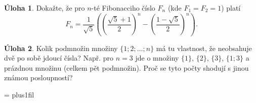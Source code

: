 \documentclass[10pt,a5paper]{extarticle}
\let\results\newpage
\let\endresults\relax
\theoremstyle{definition}
\newtheorem{uloha}{\atr Úloha}
\def\vysld{}
\let\printvysl\relax
\def\atr{}
\def\interest{\def\atr{\llap{$\star$ }\gdef\atr{}}}
\def\iinterest{\def\atr{\llap{$\star\star$ }\gdef\atr{}}}
\begin{document}
\interest
\begin{uloha}
Dokažte, že pro $n$-té Fibonacciho číslo $F_n$ (kde $F_1=F_2 = 1$) platí
\[ F_n = \frac{1}{\sqrt5}\left( \left( \frac{\sqrt5+1}{2} \right)^n - \left( \frac{1-\sqrt5}{2} \right)^n  \right). \]
\end{uloha}


\iinterest
\begin{uloha}
Kolik podmnožin množiny $\{1; 2; \dots; n\}$ má tu vlastnost, že neobsahuje dvě po sobě jdoucí čísla? Např. pro $n = 3$ jde o množiny $\{1\}$, $\{2\}$, $\{3\}$, $\{1; 3\}$ a prázdnou množinu (celkem pět podmnožin). Proč se tyto počty shodují s jinou známou posloupností?
\end{uloha}


\baselineskip
{}

\results
\parindent=0pt
\parskip=\smallskipamount
\rightskip=0pt plus1fil\relax
\def\printvysl#1#2{\textbf{#1.} #2\par}
\vysld
\endresults
\end{document}
